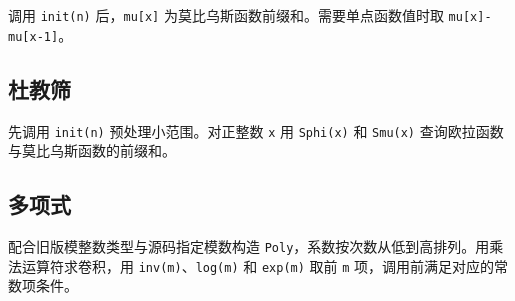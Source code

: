 调用 \texttt{init(n)} 后，\texttt{mu[x]} 为莫比乌斯函数前缀和。需要单点函数值时取 \texttt{mu[x]-mu[x-1]}。


\subsection{杜教筛}

先调用 \texttt{init(n)} 预处理小范围。对正整数 \texttt{x} 用 \texttt{Sphi(x)} 和 \texttt{Smu(x)} 查询欧拉函数与莫比乌斯函数的前缀和。


\subsection{多项式}

配合旧版模整数类型与源码指定模数构造 \texttt{Poly}，系数按次数从低到高排列。用乘法运算符求卷积，用 \texttt{inv(m)}、\texttt{log(m)} 和 \texttt{exp(m)} 取前 \texttt{m} 项，调用前满足对应的常数项条件。

